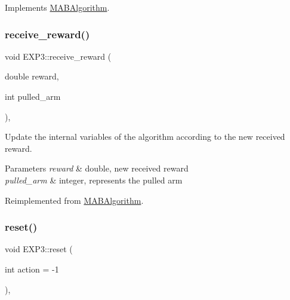 Implements \mbox{\hyperlink{class_m_a_b_algorithm_afb48f01df0e1860d19759f6e20335007}{M\+A\+B\+Algorithm}}.

\mbox{\label{class_e_x_p3_a9408f963aa533ffb298deba2fbc65529}} 
\subsubsection{\texorpdfstring{receive\+\_\+reward()}{receive\_reward()}}
{\footnotesize\ttfamily void E\+X\+P3\+::receive\+\_\+reward (\begin{DoxyParamCaption}\item[{double}]{reward,  }\item[{int}]{pulled\+\_\+arm }\end{DoxyParamCaption})\hspace{0.3cm}{\ttfamily [override]}, {\ttfamily [virtual]}}



Update the internal variables of the algorithm according to the new received reward. 


\begin{DoxyParams}{Parameters}
{\em reward} & double, new received reward \\
\hline
{\em pulled\+\_\+arm} & integer, represents the pulled arm \\
\hline
\end{DoxyParams}


Reimplemented from \mbox{\hyperlink{class_m_a_b_algorithm_aa584b3d6b86fa050e3389be9781b5782}{M\+A\+B\+Algorithm}}.

\mbox{\label{class_e_x_p3_a30530aa50cd991eda2f9f2f170b92d0e}} 
\subsubsection{\texorpdfstring{reset()}{reset()}}
{\footnotesize\ttfamily void E\+X\+P3\+::reset (\begin{DoxyParamCaption}\item[{int}]{action = {\ttfamily -\/1} }\end{DoxyParamCaption})\hspace{0.3cm}{\ttfamily [override]}, {\ttfamily [virtual]}}




